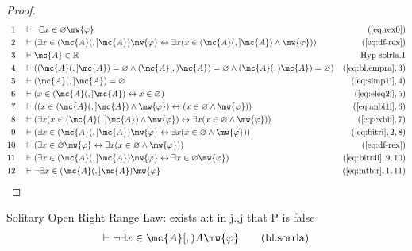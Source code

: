 \begin{proof}
\begin{align}
  1 &&  & \vdash \lnot \exists x \in \varnothing
     \mw{\varphi}&(\mbox{\ref{eq:rex0}})\notag
  \\ 2 &&  & \vdash ( \exists x \in ( \mc{A} (,] \mc{A} ) \mw{\varphi} \leftrightarrow
     \exists x ( x \in ( \mc{A} (,] \mc{A} ) \wedge \mw{\varphi} )
     )&(\mbox{\ref{eq:df-rex}})\notag
  \\ 3 &&  & \vdash \mc{A} \in \mathbb{R}&\text{Hyp~solrla.1}\notag%
  \\ 4 &&  & \vdash ( ( \mc{A} (,] \mc{A} ) = \varnothing \wedge ( \mc{A} [,) \mc{A} ) =
     \varnothing \wedge ( \mc{A} (,) \mc{A} ) = \varnothing
     )&(\mbox{\ref{eq:bl.empra}},3)\notag
  \\ 5 &&  & \vdash ( \mc{A} (,] \mc{A} ) = \varnothing&(\mbox{\ref{eq:simp1i}},4)\notag
  \\ 6 &&  & \vdash ( x \in ( \mc{A} (,] \mc{A} ) \leftrightarrow x \in \varnothing
     )&(\mbox{\ref{eq:eleq2i}},5)\notag
  \\ 7 &&  & \vdash ( ( x \in ( \mc{A} (,] \mc{A} ) \wedge \mw{\varphi} ) \leftrightarrow
     ( x \in \varnothing \wedge \mw{\varphi} )
     )&(\mbox{\ref{eq:anbi1i}},6)\notag
  \\ 8 &&  & \vdash ( \exists x ( x \in ( \mc{A} (,] \mc{A} ) \wedge \mw{\varphi} )
     \leftrightarrow \exists x ( x \in \varnothing \wedge
     \mw{\varphi} ) )&(\mbox{\ref{eq:exbii}},7)\notag
  \\ 9 &&  & \vdash ( \exists x \in ( \mc{A} (,] \mc{A} ) \mw{\varphi} \leftrightarrow
     \exists x ( x \in \varnothing \wedge \mw{\varphi} )
     )&(\mbox{\ref{eq:bitri}},2,8)\notag
  \\ 10 &&  & \vdash ( \exists x \in \varnothing \mw{\varphi} \leftrightarrow
     \exists x ( x \in \varnothing \wedge \mw{\varphi} )
     )&(\mbox{\ref{eq:df-rex}})\notag
  \\ 11 &&  & \vdash ( \exists x \in ( \mc{A} (,] \mc{A} ) \mw{\varphi} \leftrightarrow
     \exists x \in \varnothing \mw{\varphi}
     )&(\mbox{\ref{eq:bitr4i}},9,10)\notag
  \\ 12 &&  & \vdash \lnot \exists x \in ( \mc{A} (,] \mc{A} )
     \mw{\varphi}&(\mbox{\ref{eq:mtbir}},1,11)\notag
\end{align}
\end{proof}

\begin{lemma} {Solitary Open Right Range Law: exists a:t
in j.,j that P is false}
\begin{align}
\vdash \lnot \exists x \in \mc{A} [,) A
    \mw{\varphi}\label{eq:bl.sorrla}\tag{bl.sorrla}
\end{align}
\end{lemma}

